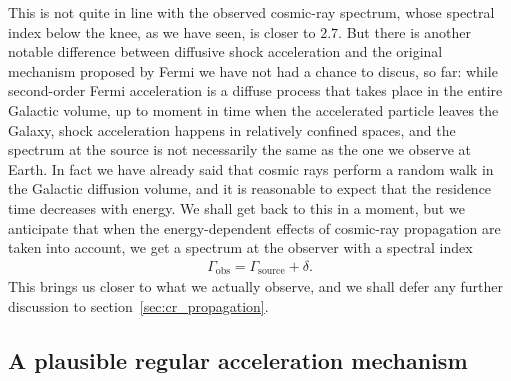 This is not quite in line with the observed cosmic-ray spectrum, whose spectral
index below the knee, as we have seen, is closer to $2.7$. But there is another
notable difference between diffusive shock acceleration and the original mechanism
proposed by Fermi we have not had a chance to discus, so far: while second-order
Fermi acceleration is a diffuse process that takes place in the entire Galactic
volume, up to moment in time when the accelerated particle leaves the Galaxy,
shock acceleration happens in relatively confined spaces, and the spectrum at the
source is not necessarily the same as the one we observe at Earth. In fact we have
already said that cosmic rays perform a random walk in the Galactic diffusion volume,
and it is reasonable to expect that the residence time decreases with energy.
We shall get back to this in a moment, but we anticipate that when the energy-dependent
effects of cosmic-ray propagation are taken into account, we get a spectrum at the
observer with a spectral index
\begin{align}
  \Gamma_\text{obs} = \Gamma_\text{source} + \delta.
\end{align}
This brings us closer to what we actually observe, and we shall defer any further
discussion to section~\ref{sec:cr_propagation}.


\subsection{A plausible regular acceleration mechanism}

